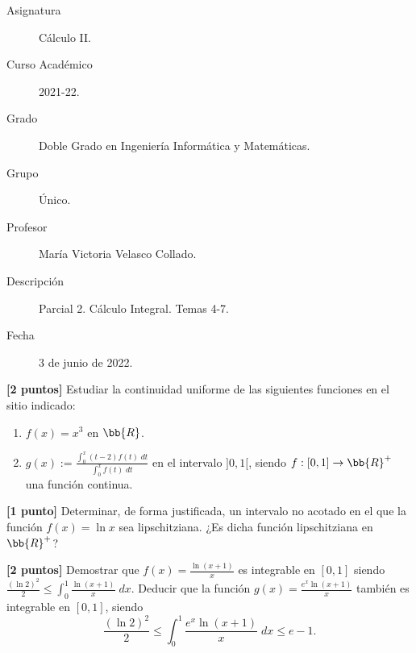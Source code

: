 \documentclass[12pt]{article}
\begin{document}

    
    

    \begin{description}
        \item[Asignatura] Cálculo II.
        \item[Curso Académico] 2021-22.
        \item[Grado] Doble Grado en Ingeniería Informática y Matemáticas.
        \item[Grupo] Único.
        \item[Profesor] María Victoria Velasco Collado.
        \item[Descripción] Parcial 2. Cálculo Integral. Temas 4-7.
        \item[Fecha] 3 de junio de 2022.
    
    \end{description}
    \newpage
    
    \begin{ejercicio}\textbf{[2 puntos]}
        Estudiar la continuidad uniforme de las siguientes funciones en el sitio indicado:
        \begin{enumerate}
            \item $f(x)=x^3$ en $\bb{R}$.
            \item $\displaystyle g(x):=\frac{\int_0^x (t-2)f(t)\;dt}{\int_0^x f(t)\;dt}$ en el intervalo $]0,1[$, siendo $f:[0,1]\to \bb{R}^+$ una función continua.
        \end{enumerate}
    \end{ejercicio}

    \begin{ejercicio}\textbf{[1 punto]}
        Determinar, de forma justificada, un intervalo no acotado en el que la función $f(x) = \ln x$ sea lipschitziana. ¿Es dicha función lipschitziana en $\bb{R}^+$?
    \end{ejercicio}

    \begin{ejercicio}\textbf{[2 puntos]}
        Demostrar que $f(x)=\frac{\ln (x+1)}{x}$ es integrable en $[0,1]$ siendo $\displaystyle \frac{(\ln 2)^2}{2}\leq \int_0^1 \frac{\ln(x+1)}{x}\;dx$. Deducir que la función $g(x)=\frac{e^x \ln (x+1)}{x}$ también es integrable en $[0,1]$, siendo
        \begin{equation*}
            \frac{(\ln 2)^2}{2}\leq \int_0^1 \frac{e^x \ln(x+1)}{x}\;dx \leq e-1.
        \end{equation*}
    \end{ejercicio}
\end{document}

